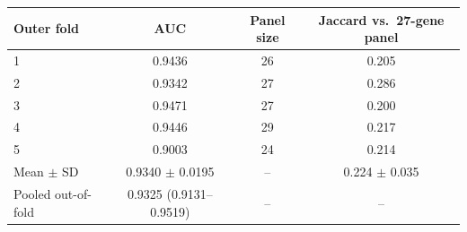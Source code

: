 \small
\begin{tabular}{lccc}
\toprule
Outer fold & AUC & Panel size & Jaccard vs.\ 27-gene panel \\
\midrule
1 & 0.9436 & 26 & 0.205 \\
2 & 0.9342 & 27 & 0.286 \\
3 & 0.9471 & 27 & 0.200 \\
4 & 0.9446 & 29 & 0.217 \\
5 & 0.9003 & 24 & 0.214 \\
Mean $\pm$ SD & 0.9340 $\pm$ 0.0195 & -- & 0.224 $\pm$ 0.035 \\
Pooled out-of-fold & 0.9325 (0.9131--0.9519) & -- & -- \\
\bottomrule
\end{tabular}

